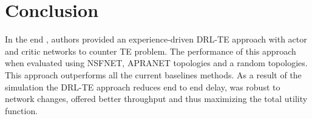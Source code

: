 \section{Conclusion}
\label{sec:concl}

In the end , authors provided an experience-driven DRL-TE \cite{Exp:_DRLapproach} approach with actor and critic networks 
to counter TE problem. The performance of this approach when evaluated using NSFNET, APRANET topologies and a random topologies. This approach
outperforms all the current baselines methods. As a result of the simulation the DRL-TE approach reduces end to end delay, was robust to network changes, offered better throughput and thus maximizing the total utility function.
